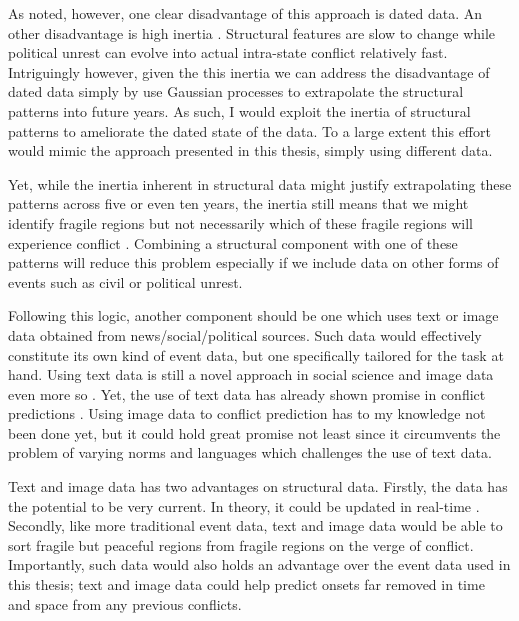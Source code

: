 \documentclass[a4paper]{article}
\begin{document}
As noted, however, one clear disadvantage of this approach is dated data. An other disadvantage is high inertia \citep[10]{chadefaux2017conflict}. Structural features are slow to change while political unrest can evolve into actual intra-state conflict relatively fast. Intriguingly however, given the this inertia we can address the disadvantage of dated data simply by use Gaussian processes to extrapolate the structural patterns into future years. As such, I would exploit the inertia of structural patterns to ameliorate the dated state of the data. To a large extent this effort would mimic the approach presented in this thesis, simply using different data.\par

Yet, while the inertia inherent in structural data might justify extrapolating these patterns across five or even ten years, the inertia still means that we might identify fragile regions but not necessarily which of these fragile regions will experience conflict \citep[10]{chadefaux2017conflict}. Combining a structural component with one of these patterns will reduce this problem especially if we include data on other forms of events such as civil or political unrest.\par 

Following this logic, another component should be one which uses text or image data obtained from news/social/political sources. Such data would effectively constitute its own kind of event data, but one specifically tailored for the task at hand. Using text data is still a novel approach in social science \citep{grimmer2013text} and image data even more so \citep{williams2019images}. Yet, the use of text data has already shown promise in conflict predictions \citep{chadefaux_2014, mueller_2016}. Using image data to conflict prediction has to my knowledge not been done yet, but it could hold great promise not least since it circumvents the problem of varying norms and languages which challenges the use of text data. \par

Text and image data has two advantages on structural data. Firstly, the data has the potential to be very current. In theory, it could be updated in real-time \citep[474]{cederman2017predicting}. Secondly, like more traditional event data, text and image data would be able to sort fragile but peaceful regions from fragile regions on the verge of conflict. Importantly, such data would also holds an advantage over the event data used in this thesis; text and image data could help predict onsets far removed in time and space from any previous conflicts.\par
\end{document}
